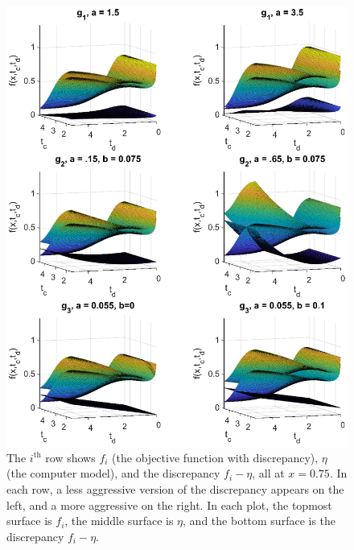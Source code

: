 \documentclass[12pt]{article}
\begin{document}
\begin{figure}
\centering
\includegraphics[scale=0.85]{FIG_six_discrepancies.eps}
\captionsetup{width=.85\linewidth}
\caption{The $i^{\text{th}}$ row shows $f_i$ (the objective function with discrepancy), $\eta$ (the computer model), and the discrepancy $f_i-\eta$, all at $x=0.75$. In each row, a less aggressive version of the discrepancy appears on the left, and a more aggressive on the right. In each plot, the topmost surface is $f_i$, the middle surface is $\eta$, and the bottom surface is the discrepancy $f_i-\eta$.}
\label{fig:discrepancies}
\end{figure}
%
\end{document}
